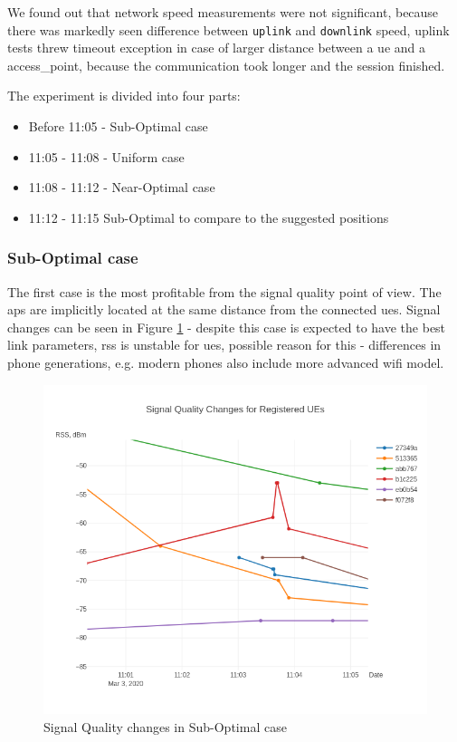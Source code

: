 We found out that network speed measurements were not significant, because there was markedly seen difference between \texttt{uplink} and \texttt{downlink} speed, uplink tests threw timeout exception in case of larger distance between a \gls{ue} and a \gls{access_point}, because the communication took longer and the session finished.

The experiment is divided into four parts:

\begin{itemize}
\tightlist
\item
  Before 11:05 - Sub-Optimal case
\item
  11:05 - 11:08 - Uniform case
\item
  11:08 - 11:12 - Near-Optimal case
\item
  11:12 - 11:15 Sub-Optimal to compare to the suggested positions
\end{itemize}

\subsubsection{Sub-Optimal case}

The first case is the most profitable from the signal quality point of
view. The \glspl{ap} are implicitly located at the same distance from the
connected \glspl{ue}. Signal changes can be seen in Figure \ref{fig:signal-quality-changes-sub-optimal} - despite this case is expected to have the best link parameters, \gls{rss} is unstable for \glspl{ue}, possible reason for this - differences in phone generations, e.g. modern phones also include more advanced \gls{wifi} model.

\begin{figure}[H]
	\centering
	\includegraphics[width=0.7\linewidth,keepaspectratio]{images/Exp4_Suboptimal.png}
\caption{Signal Quality changes in Sub-Optimal case}
\label{fig:signal-quality-changes-sub-optimal}
\end{figure}

